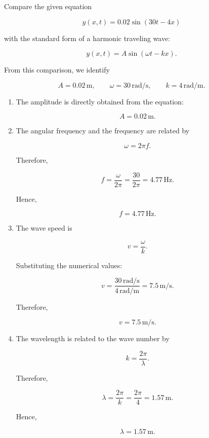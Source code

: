 \documentclass[t,aspectratio=169]{beamer}
\begin{document}
\begin{frame}
\begin{enumerate}
\begin{center}
\end{center}

\pagebreak
Compare the given equation

$$y(x,t)=0.02\sin(30t-4x)$$

with the standard form of a harmonic traveling wave:

$$y(x,t)=A\sin(\omega t-kx).$$

From this comparison, we identify

$$A=0.02\,\mathrm{m},\qquad \omega=30\,\mathrm{rad/s},\qquad k=4\,\mathrm{rad/m}.$$

\begin{enumerate}
\item[(a)] The amplitude is directly obtained from the equation:

$$\boxed{A=0.02\,\mathrm{m}}.$$

\pagebreak
\item[(b)] The angular frequency and the frequency are related by

$$\omega=2\pi f.$$

Therefore,

$$f=\frac{\omega}{2\pi}=\frac{30}{2\pi}=4.77\,\mathrm{Hz}.$$

Hence,

$$\boxed{f=4.77\,\mathrm{Hz}}.$$

\pagebreak
\item[(c)] The wave speed is

$$v=\frac{\omega}{k}.$$

Substituting the numerical values:

$$v=\frac{30\,\mathrm{rad/s}}{4\,\mathrm{rad/m}}=7.5\,\mathrm{m/s}.$$

Therefore,

$$\boxed{v=7.5\,\mathrm{m/s}}.$$

\pagebreak
\item[(d)] The wavelength is related to the wave number by

$$k=\frac{2\pi}{\lambda}.$$

Therefore,

$$\lambda=\frac{2\pi}{k}=\frac{2\pi}{4}=1.57\,\mathrm{m}.$$

Hence,

$$\boxed{\lambda=1.57\,\mathrm{m}}.$$


\end{enumerate}
\end{enumerate}
\end{frame}
\end{document}
